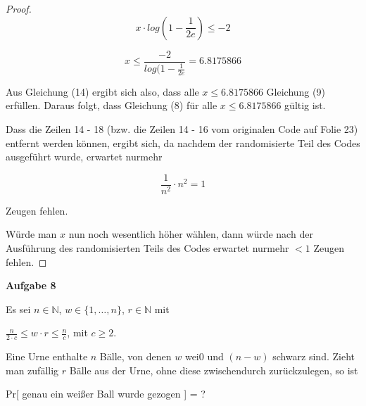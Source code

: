 \documentclass{article}
\begin{document}
\begin{proof}
  \begin{equation}
    x \cdot log \left( 1 - \frac{1}{2e} \right) \leq -2
  \end{equation}

  \begin{equation}
    x \leq \frac{-2}{log(1 - \frac{1}{2e}} = 6.8175866
  \end{equation}

  Aus Gleichung (14) ergibt sich also, dass alle $x \leq 6.8175866$ Gleichung (9)
  erf{\"u}llen. \newline
  Daraus folgt, dass Gleichung (8) f{\"u}r alle $x \leq 6.8175866$ g{\"u}ltig ist.

  Dass die Zeilen 14 - 18 (bzw. die Zeilen 14 - 16 vom originalen Code auf Folie
  23) entfernt werden k{\"o}nnen, ergibt sich, da nachdem der randomisierte
  Teil des Codes ausgef{\"u}hrt wurde, erwartet nurmehr

  \begin{equation}
    \frac{1}{n^2} \cdot n^2 = 1
  \end{equation}

  Zeugen fehlen.

  W{\"u}rde man $x$ nun noch wesentlich h{\"o}her w{\"a}hlen, dann w{\"u}rde
  nach der Ausf{\"u}hrung des randomisierten Teils des Codes erwartet nurmehr
  $< 1$ Zeugen fehlen.
\end{proof}

\newpage
{\noindent\bfseries Aufgabe 8}%
\medskip%

\noindent
Es sei $n \in \mathbb{N}$, $w \in \{ 1, \ldots, n \}$, $r \in \mathbb{N}$ mit
\begin{center}
  $\frac{n}{2 \cdot c} \leq w \cdot r \leq \frac{n}{c}$, mit $c \geq 2$.
\end{center}
Eine Urne enthalte $n$ B{\"a}lle, von denen $w$ wei0 und $(n - w)$ schwarz sind.
Zieht man zuf{\"a}llig $r$ B{\"a}lle aus der Urne, ohne diese zwischendurch
zur{\"u}ckzulegen, so ist
\begin{center}
  Pr[ genau ein wei{\ss}er Ball wurde gezogen ] = ?
\end{center}
\end{document}
